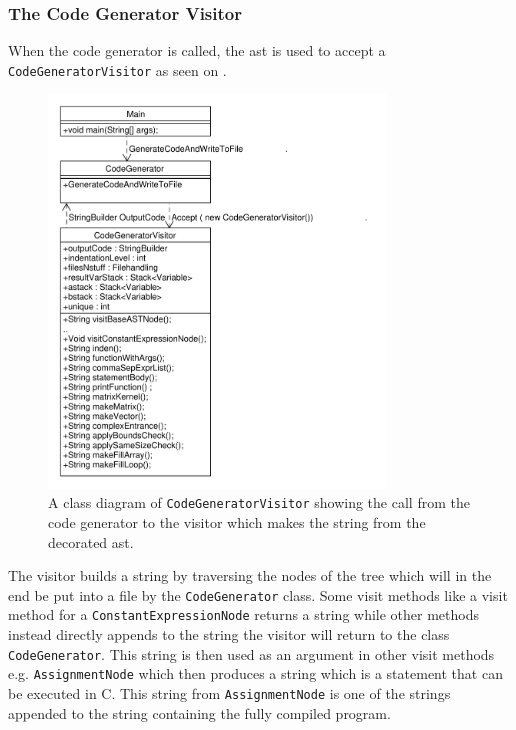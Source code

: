 \subsubsection*{The Code Generator Visitor}
When the code generator is called, the \acrshort{ast} is used to accept a \texttt{CodeGeneratorVisitor} as seen on .

\begin{figure}[!ht]
\centering
 \includegraphics[width=0.8\textwidth]{figures/ClassDiagrams/CodeGeneratorCall.pdf}%
\caption{A class diagram of \texttt{CodeGeneratorVisitor} showing the call from the code generator to the visitor which makes the string from the decorated \acrshort{ast}.}\label{fig:CodeGeneratorVisitor}
\vspace{-15pt}
\end{figure}

The visitor builds a string by traversing the nodes of the tree which will in the end be put into a file by the \texttt{CodeGenerator} class.
Some visit methods like a visit method for a \texttt{ConstantExpressionNode} returns a string while other methods instead directly appends to the string the visitor will return to the class \texttt{CodeGenerator}.
This string is then used as an argument in other visit methods e.g. \texttt{AssignmentNode} which then produces a string which is a statement that can be executed in C.
This string from \texttt{AssignmentNode} is  one of the strings appended to the string containing the fully compiled program.

